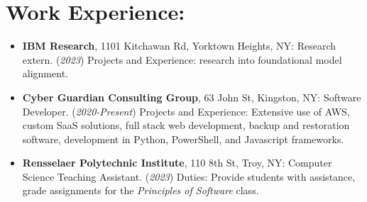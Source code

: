 \section*{Work Experience:}
\begin{itemize}
    \itemsep0em 
    \item \textbf{IBM Research}, 1101 Kitchawan Rd, Yorktown Heights, NY: Research extern. (\textit{2023}) Projects and Experience: research into foundational model alignment.
    \item \textbf{Cyber Guardian Consulting Group}, 63 John St, Kingston, NY: Software Developer. (\textit{2020-Present}) Projects and Experience: Extensive use of AWS, custom SaaS solutions, full stack web development, backup and restoration software, development in Python, PowerShell, and Javascript frameworks.
    \item \textbf{Rensselaer Polytechnic Institute}, 110 8th St, Troy, NY: Computer Science Teaching Assistant. (\textit{2023}) Duties: Provide students with assistance, grade assignments for the \textit{Principles of Software} class.
\end{itemize}